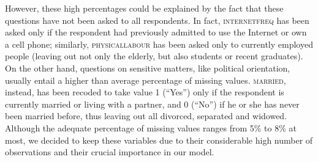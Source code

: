 However, these high percentages could be explained by the fact that
these questions have not been asked to all respondents. In fact, \textsc{internetfreq}
has been asked only if the respondent had previously admitted to use
the Internet or own a cell phone; similarly, \textsc{physicallabour}
has been asked only to currently employed people (leaving out not
only the elderly, but also students or recent graduates). On the other
hand, questions on sensitive matters, like political orientation,
usually entail a higher than average percentage of missing values.
\textsc{married}, instead, has been recoded to take value 1 (\textquotedblleft Yes\textquotedblright )
only if the respondent is currently married or living with a partner,
and 0 (\textquotedblleft No\textquotedblright ) if he or she has never
been married before, thus leaving out all divorced, separated and
widowed. Although the adequate percentage of missing values ranges
from 5\% to 8\% at most, we decided to keep these variables due to
their considerable high number of observations and their crucial importance
in our model.

